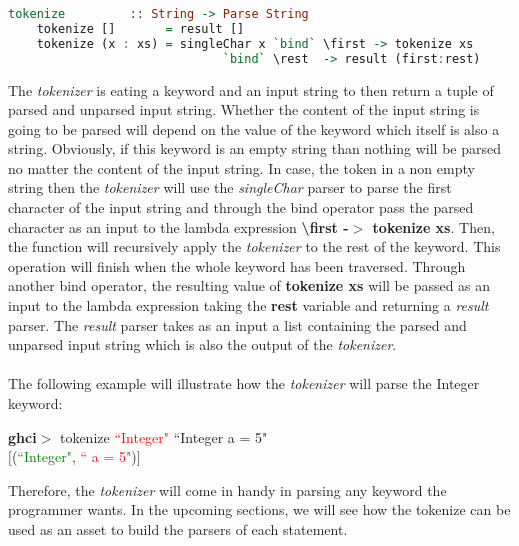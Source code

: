 \documentclass[a4paper, onecolumn]{article}
\begin{document}
    \begin{tcolorbox}
    \begin{lstlisting}[language=Haskell] 
    tokenize         :: String -> Parse String
    tokenize []       = result []
    tokenize (x : xs) = singleChar x `bind` \first -> tokenize xs 
                              `bind` \rest  -> result (first:rest)
     \end{lstlisting}
    \end{tcolorbox}
    
    \noindent The \textit{tokenizer} is eating a keyword and an input string to then return a tuple of parsed and unparsed input string. Whether the content of the input string is going to be parsed will depend on the value of the keyword which itself is also a string. Obviously, if this keyword is an empty string than nothing will be parsed no matter the content of the input string. In case, the token in a non empty string then the \textit{tokenizer} will use the \textit{singleChar} parser to parse the first character of the input string and through the bind operator pass the parsed character as an input to the lambda expression \textbf{\textbackslash first -$>$ tokenize xs}. Then, the function will recursively apply the \textit{tokenizer} to the rest of the keyword. This operation will finish when the whole keyword has been traversed. Through another bind operator, the resulting value of \textbf{tokenize xs} will be passed as an input to the lambda expression taking the \textbf{rest} variable and returning a \textit{result} parser. The \textit{result} parser takes as an input a list containing the parsed and unparsed input string which is also the output of the \textit{tokenizer}. \\ \\
    The following example will illustrate how the \textit{tokenizer} will parse the Integer keyword:
    
    \begin{center}
            \textbf{ghci$>$} tokenize \textcolor{red}{``Integer"} ``Integer a = 5" \\
             $\big[$(\textcolor{green}{``Integer"}, \textcolor{red}{`` a = 5"})$\big]$
        \end{center}
    
    \noindent Therefore, the \textit{tokenizer} will come in handy in parsing any keyword the programmer wants. In the upcoming sections, we will see how the tokenize can be used as an asset to build the parsers of each statement. 
    
\end{document}
